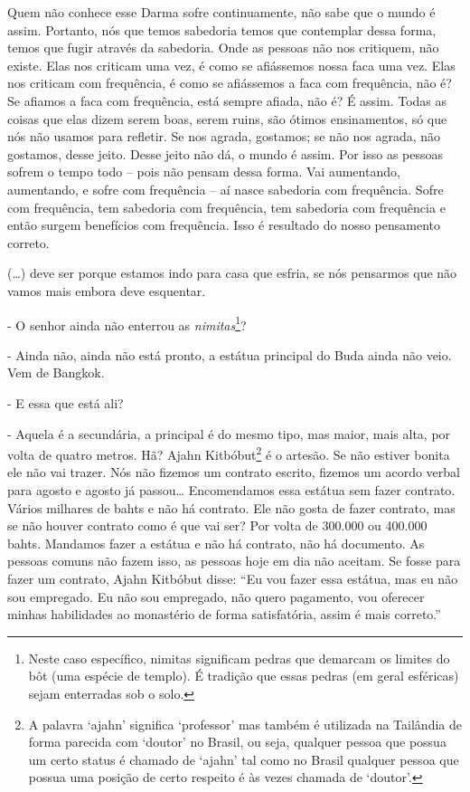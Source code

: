 Quem não conhece esse Darma sofre continuamente, não sabe que o
mundo é assim. Portanto, nós que temos sabedoria temos que contemplar
dessa forma, temos que fugir através da sabedoria. Onde as pessoas não
nos critiquem, não existe. Elas nos criticam uma vez, é como se
afiássemos nossa faca uma vez. Elas nos criticam com frequência, é como
se afiássemos a faca com frequência, não é? Se afiamos a faca com
frequência, está sempre afiada, não é? É assim. Todas as coisas que
elas dizem serem boas, serem ruins, são ótimos ensinamentos, só que nós
não usamos para refletir. Se nos agrada, gostamos; se não nos agrada,
não gostamos, desse jeito. Desse jeito não dá, o mundo é assim. Por
isso as pessoas sofrem o tempo todo – pois não pensam dessa forma. Vai
aumentando, aumentando, e sofre com frequência – aí nasce sabedoria com
frequência. Sofre com frequência, tem sabedoria com frequência, tem
sabedoria com frequência e então surgem benefícios com frequência. Isso
é resultado do nosso pensamento correto.

(…) deve ser porque estamos indo para casa que esfria, se nós
pensarmos que não vamos mais embora deve esquentar. 

{}- O senhor ainda não enterrou as \textit{nimitas}\footnote{Neste
caso específico, nimitas significam pedras que demarcam os limites do
bôt (uma espécie de templo). É tradição que essas pedras (em geral
esféricas) sejam enterradas sob o solo. }?

{}- Ainda não, ainda não está pronto, a estátua principal do Buda
ainda não veio. Vem de Bangkok.

{}- E essa que está ali?

{}- Aquela é a secundária, a principal é do mesmo tipo, mas maior,
mais alta, por volta de quatro metros. Hã? Ajahn Kitbóbut\footnote{A
palavra ‘ajahn’ significa ‘professor’ mas também é utilizada na
Tailândia de forma parecida com ‘doutor’ no Brasil, ou seja, qualquer
pessoa que possua um certo status é chamado de ‘ajahn’ tal como no
Brasil qualquer pessoa que possua uma posição de certo respeito é às
vezes chamada de ‘doutor’. } é o artesão. Se não estiver bonita ele não
vai trazer. Nós não fizemos um contrato escrito, fizemos um acordo
verbal para agosto e agosto já passou… Encomendamos essa estátua sem
fazer contrato. Vários milhares de bahts e não há contrato. Ele não
gosta de fazer contrato, mas se não houver contrato como é que vai ser?
Por volta de 300.000 ou 400.000 bahts. Mandamos fazer a estátua e não
há contrato, não há documento. As pessoas comuns não fazem isso, as
pessoas hoje em dia não aceitam. Se fosse para fazer um contrato, Ajahn
Kitbóbut disse: “Eu vou fazer essa estátua, mas eu não sou empregado.
Eu não sou empregado, não quero pagamento, vou oferecer minhas
habilidades ao monastério de forma satisfatória, assim é mais correto.”

